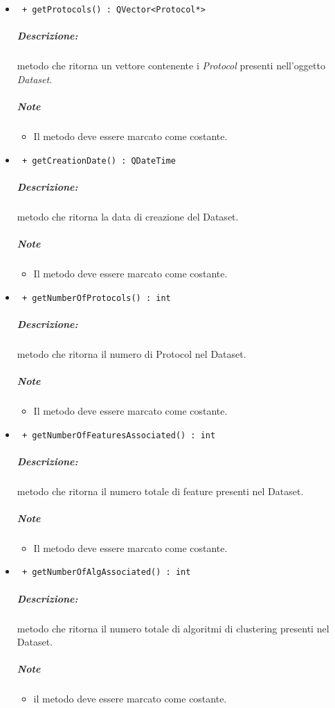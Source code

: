 \begin{itemize}
		\item \color{blue}\verb! + getProtocols() : QVector<Protocol*> !\\
		\color{black}
		\subparagraph{Descrizione:} metodo che ritorna un vettore contenente i \textsl{Protocol} presenti nell'oggetto \textsl{Dataset}.
		\subparagraph{Note}
			\begin{itemize}
				\item Il metodo deve essere marcato come costante.
			\end{itemize}
		
		\item \color{blue}\verb! + getCreationDate() : QDateTime!\\
		\color{black}
		\subparagraph{Descrizione:} metodo che ritorna la data di creazione del Dataset\g{}.
		\subparagraph{Note}
			\begin{itemize}
				\item Il metodo deve essere marcato come costante.
			\end{itemize}
			
		\item \color{blue}\verb! + getNumberOfProtocols() : int!\\
		\color{black}
		\subparagraph{Descrizione:} metodo che ritorna il numero di Protocol\g{} nel Dataset\g{}.
		\subparagraph{Note}
			\begin{itemize}
				\item Il metodo deve essere marcato come costante.
			\end{itemize}
			
		\item \color{blue}\verb! + getNumberOfFeaturesAssociated() : int!\\
		\color{black}
		\subparagraph{Descrizione:} metodo che ritorna il numero totale di feature\g{} presenti nel Dataset\g{}.
		\subparagraph{Note}
			\begin{itemize}
				\item Il metodo deve essere marcato come costante.
			\end{itemize}
			
		\item \color{blue}\verb! + getNumberOfAlgAssociated() : int!\\
		\color{black}
		\subparagraph{Descrizione:} metodo che ritorna il numero totale di algoritmi di clustering\g{} presenti nel Dataset\g{}.
		\subparagraph{Note}
			\begin{itemize}
				\item il metodo deve essere marcato come costante.
			\end{itemize}
		
		
		
		
		
		
	\end{itemize}
\pagebreak
\color{black}
